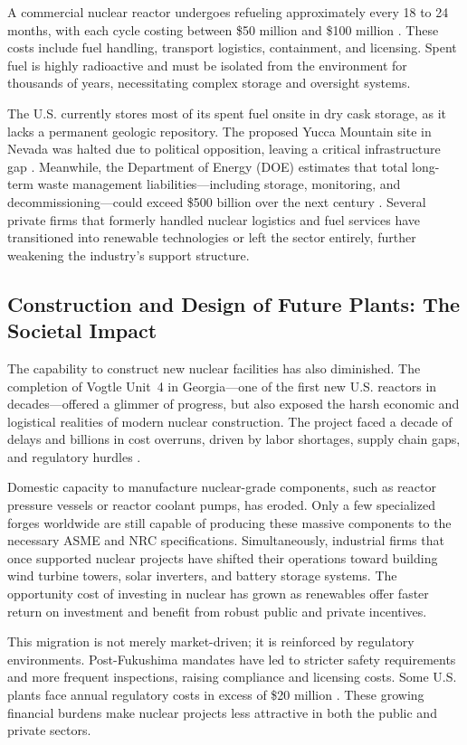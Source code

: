 \documentclass[12pt]{article}
\begin{document}
A commercial nuclear reactor undergoes refueling approximately every 18 to 24 months, with each cycle costing between \$50 million and \$100 million \autocite{wnisr2022}. These costs include fuel handling, transport logistics, containment, and licensing. Spent fuel is highly radioactive and must be isolated from the environment for thousands of years, necessitating complex storage and oversight systems.

The U.S. currently stores most of its spent fuel onsite in dry cask storage, as it lacks a permanent geologic repository. The proposed Yucca Mountain site in Nevada was halted due to political opposition, leaving a critical infrastructure gap \autocite{doe2020}. Meanwhile, the Department of Energy (DOE) estimates that total long-term waste management liabilities—including storage, monitoring, and decommissioning—could exceed \$500 billion over the next century \autocite{doe2020}. Several private firms that formerly handled nuclear logistics and fuel services have transitioned into renewable technologies or left the sector entirely, further weakening the industry’s support structure.

\subsection{Construction and Design of Future Plants: The Societal Impact}
The capability to construct new nuclear facilities has also diminished. The completion of Vogtle Unit~4 in Georgia—one of the first new U.S. reactors in decades—offered a glimmer of progress, but also exposed the harsh economic and logistical realities of modern nuclear construction. The project faced a decade of delays and billions in cost overruns, driven by labor shortages, supply chain gaps, and regulatory hurdles \autocite{aafnuclearcosts}.

Domestic capacity to manufacture nuclear-grade components, such as reactor pressure vessels or reactor coolant pumps, has eroded. Only a few specialized forges worldwide are still capable of producing these massive components to the necessary ASME and NRC specifications. Simultaneously, industrial firms that once supported nuclear projects have shifted their operations toward building wind turbine towers, solar inverters, and battery storage systems. The opportunity cost of investing in nuclear has grown as renewables offer faster return on investment and benefit from robust public and private incentives.

This migration is not merely market-driven; it is reinforced by regulatory environments. Post-Fukushima mandates have led to stricter safety requirements and more frequent inspections, raising compliance and licensing costs. Some U.S. plants face annual regulatory costs in excess of \$20 million \autocite{aafnuclearcosts}. These growing financial burdens make nuclear projects less attractive in both the public and private sectors.
\end{document}

